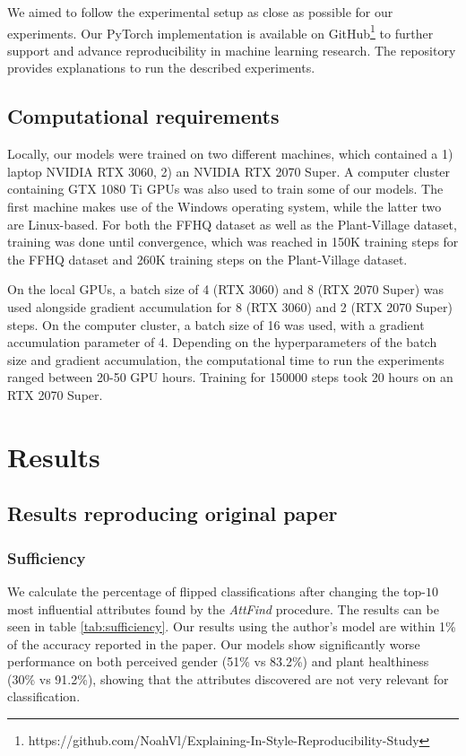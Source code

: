 We aimed to follow the experimental setup as close as possible for our experiments. Our PyTorch implementation is available on GitHub\footnote{https://github.com/NoahVl/Explaining-In-Style-Reproducibility-Study} to further support and advance reproducibility in machine learning research. The repository provides explanations to run the described experiments.


\subsection{Computational requirements} 

Locally, our models were trained on two different machines, which contained a 1) laptop NVIDIA RTX 3060, 2) an NVIDIA RTX 2070 Super. A computer cluster containing GTX 1080 Ti GPUs was also used to train some of our models. The first machine makes use of the Windows operating system, while the latter two are Linux-based. For both the FFHQ dataset as well as the Plant-Village dataset, training was done until convergence, which was reached in 150K training steps for the FFHQ dataset and 260K training steps on the Plant-Village dataset. 

On the local GPUs, a batch size of 4 (RTX 3060) and 8 (RTX 2070 Super) was used alongside gradient accumulation for 8 (RTX 3060) and 2 (RTX 2070 Super) steps. On the computer cluster, a batch size of 16 was used, with a gradient accumulation parameter of 4. Depending on the hyperparameters of the batch size and gradient accumulation, the computational time to run the experiments ranged between 20-50 GPU hours. Training for 150000 steps took 20 hours on an RTX 2070 Super.


\section{Results}
\label{sec:results}


\subsection{Results reproducing original paper}

\subsubsection{Sufficiency}

We calculate the percentage of flipped classifications after changing the top-$10$ most influential attributes found by the \textit{AttFind} procedure. The results can be seen in table \ref{tab:sufficiency}. Our results using the author's model are within 1\% of the accuracy reported in the paper. Our models show significantly worse performance on both perceived gender (51\% vs 83.2\%) and plant healthiness (30\% vs 91.2\%), showing that the attributes discovered are not very relevant for classification.

